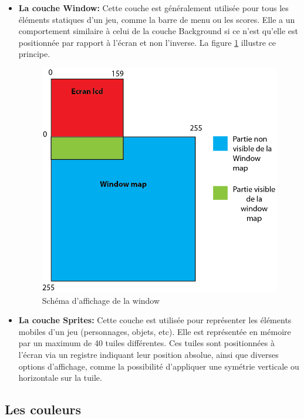 \documentclass{report}
\begin{document}
\begin{itemize}
\item \textbf{La couche Window:}
	Cette couche est généralement utilisée pour tous les éléments statiques
d'un jeu, comme la barre de menu ou les scores. Elle a un comportement
similaire à celui de la couche Background si ce n'est qu'elle est positionnée par rapport à l'écran et non l'inverse. La figure \ref{window} illustre ce principe.\\

\begin{figure}[!h]
\centering
\includegraphics[scale=0.8]{images/window.png}
\caption{Schéma d'affichage de la window}
\label{window}
\end{figure}

\item \textbf{La couche Sprites:}
	Cette couche est utilisée pour représenter les éléments mobiles d'un jeu (personnages, objets, etc). Elle est représentée en mémoire par un maximum
de 40 tuiles différentes. Ces tuiles sont positionnées à l'écran via un registre indiquant leur position absolue, ainsi que diverses options d'affichage, comme la possibilité d'appliquer une symétrie verticale ou horizontale sur la tuile.\\
\end{itemize}

\subsection{Les couleurs}
\end{document}
